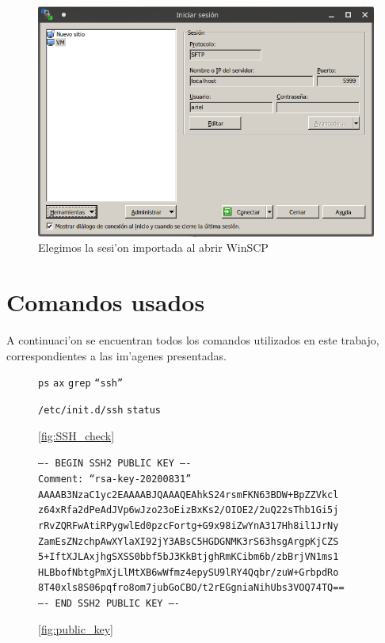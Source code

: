 \documentclass[11pt]{article}
\newcommand{\imagecaption}[1]{\vspace{-7pt}\caption*{\char91\ref{fig:#1}\char93}}
\newcommand{\codetext}[2]{\large\texttt{\textcolor{#1}{#2}}}
\begin{document}
	\begin{figure}[H]
		\centering \captionsetup{justification=centering}
		\includegraphics[width=.8\linewidth]{Images/WinSCP/fig2}
		\caption{Elegimos la sesi'on importada al abrir WinSCP}
	\end{figure}
		
	\section{Comandos usados}
		A continuaci'on se encuentran todos los comandos utilizados en este trabajo, correspondientes a las im'agenes presentadas.
		
		\begin{figure}[H]
			\centering
			\begin{code-box}
				\codetext{light-blue}{ps} \codetext{light-orange}{ax} \textbar\/ \codetext{light-blue}{grep} \codetext{light-red}{``ssh''}
				
				\codetext{light-blue}{/etc/init.d/ssh} \codetext{light-orange}{status}
			\end{code-box}
			\imagecaption{SSH_check}
		\end{figure}
		
		\begin{figure}[H]
			\centering
			\begin{code-box}
				\codetext{dark-gray}{---- BEGIN SSH2 PUBLIC KEY ----\\
				Comment: ``rsa-key-20200831''\\
				AAAAB3NzaC1yc2EAAAABJQAAAQEAhkS24rsmFKN63BDW+BpZZVkcl
				z64xRfa2dPeAdJVp6wJzo23oEizBxKs2/OIOE2/2uQ22sThb1Gi5j
				rRvZQRFwAtiRPygwlEd0pzcFortg+G9x98iZwYnA317Hh8il1JrNy
				ZamEsZNzchpAwXYlaXI92jY3ABsC5HGDGNMK3rS63hsgArgpKjCZS
				5+IftXJLAxjhgSXSS0bbf5bJ3KkBtjghRmKCibm6b/zbBrjVN1ms1
				HLBbofNbtgPmXjLlMtXB6wWfmz4epySU9lRY4Qqbr/zuW+GrbpdRo
				8T40xls8S06pqfro8om7jubGoCBO/t2rEGgniaNihUbs3VOQ74TQ==\\
				---- END SSH2 PUBLIC KEY ----}
			\end{code-box}
			\imagecaption{public_key}
		\end{figure}
		
\end{document}
